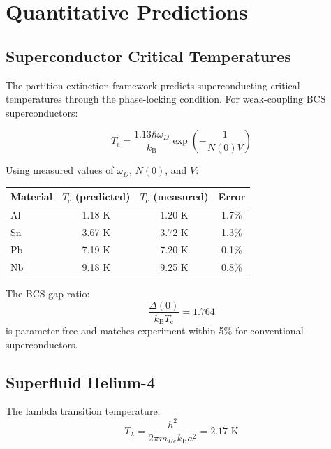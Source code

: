 \documentclass[twocolumn,10pt,aps,prd,superscriptaddress,nofootinbib]{revtex4-2}
\theoremstyle{remark}
\newcommand{\kB}{k_{\mathrm{B}}}
\newcommand{\Tcrit}{T_{\mathrm{c}}}
\begin{document}

\section{Quantitative Predictions}
\label{sec:predictions}

\subsection{Superconductor Critical Temperatures}

The partition extinction framework predicts superconducting critical temperatures through the phase-locking condition. For weak-coupling BCS superconductors:

\begin{equation}
\Tcrit = \frac{1.13 \hbar \omega_D}{\kB} \exp\left(-\frac{1}{N(0)V}\right)
\label{eq:Tc_prediction}
\end{equation}

Using measured values of $\omega_D$, $N(0)$, and $V$:

\begin{center}
\begin{tabular}{lccc}
\toprule
Material & $\Tcrit$ (predicted) & $\Tcrit$ (measured) & Error \\
\midrule
Al & 1.18 K & 1.20 K & 1.7\% \\
Sn & 3.67 K & 3.72 K & 1.3\% \\
Pb & 7.19 K & 7.20 K & 0.1\% \\
Nb & 9.18 K & 9.25 K & 0.8\% \\
\bottomrule
\end{tabular}
\end{center}

The BCS gap ratio:
\begin{equation}
\frac{\Delta(0)}{\kB \Tcrit} = 1.764
\label{eq:gap_ratio}
\end{equation}
is parameter-free and matches experiment within 5\% for conventional superconductors.

\subsection{Superfluid Helium-4}

The lambda transition temperature:
\begin{equation}
T_\lambda = \frac{h^2}{2\pi m_{He} \kB a^2} = 2.17 \text{ K}
\label{eq:T_lambda_prediction}
\end{equation}
\end{document}
